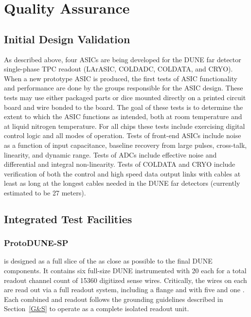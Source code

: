 \section{Quality Assurance}
\label{sec:fdsp-tpcelec-qa}

\subsection{Initial Design Validation}
\label{sec:fdsp-tpcelec-qa-initial}

As described above, four ASICs are being developed for the DUNE far detector single-phase TPC readout (LArASIC, COLDADC, COLDATA, and CRYO).  When a new prototype ASIC is produced, the first tests of ASIC functionality and performance are done by the groups responsible for the ASIC design.  These tests may use either packaged parts or dice mounted directly on a printed circuit board and wire bonded to the board.  The goal of these tests is to determine the extent to which the ASIC functions as intended, both at room temperature and at liquid nitrogen temperature.  For all chips these tests include exercising digital control logic and all modes of operation.  Tests of front-end ASICs include noise as a function of input capacitance, baseline recovery from large pulses, cross-talk, linearity, and dynamic range.  Tests of ADCs include effective noise and differential and integral non-linearity.  Tests of COLDATA and CRYO include verification of both the control and high speed data output links with cables at least as long at the longest cables needed in the DUNE far detectors (currently estimated to be 27 meters).

\subsection{Integrated Test Facilities}
\label{sec:fdsp-tpcelec-qa-facilities}

\subsubsection{ProtoDUNE-SP}
\label{sec:fdsp-tpcelec-qa-facilities-pdune}

 is designed as a full slice of the  as close as possible to the final 
DUNE \single components. It contains six full-size DUNE  instrumented with \num{20} 
 each for a total readout channel count of \num{15360} digitized sense wires. Critically, 
the wires on each  are read out via a full  readout system, including a  
flange and  with five  and one . Each combined  and 
readout follows the grounding guidelines described in Section~\ref{G&S} to operate as a complete isolated
readout unit.

